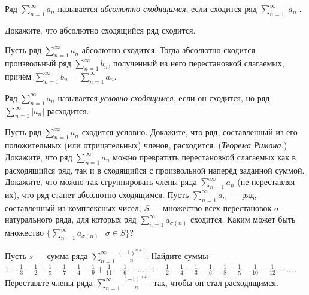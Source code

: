 \documentclass[a4paper,11pt]{article}
\begin{document}
\vspace*{-1mm}
\vspace*{-2mm}

Ряд $\sum\limits_{n=1}^\infty a_n$ называется
{\em абсолютно сходящимся}, если сходится ряд
$\sum\limits_{n=1}^\infty|a_n|$.

Докажите, что абсолютно сходящийся ряд сходится.

Пусть ряд $\sum\limits_{n=1}^\infty a_n$ абсолютно
сходится. Тогда абсолютно сходится произвольный ряд
$\sum\limits_{n=1}^\infty b_n$, полученный из него
перестановкой слагаемых, причём
$\sum\limits_{n=1}^\infty b_n=\sum\limits_{n=1}^\infty a_n$.

\vspace*{-3mm}
Ряд $\sum\limits_{n=1}^\infty a_n$ называется
{\em условно сходящимся}, если он сходится,
но ряд $\sum\limits_{n=1}^\infty|a_n|$ расходится.

Пусть ряд $\sum\limits_{n=1}^\infty a_n$ сходится условно.
Докажите, что ряд, составленный из его положительных
(или отрицательных) членов, расходится.
({\em Теорема Римана.})
Докажите, что ряд $\sum\limits_{n=1}^\infty a_n$ можно превратить
перестановкой слагаемых как в расходящийся ряд, так и в сходящийся
с произвольной наперёд заданной суммой.
Докажите, что можно так сгруппировать члены ряда
$\sum\limits_{n=1}^\infty a_n$ (не переставляя их),
что ряд станет абсолютно сходящимся.
Пусть $\sum\limits_{n=1}^\infty a_n$~--- ряд, составленный
из комплексных чисел, $S$ --- множество всех перестановок $\sigma$
натурального ряда, для которых ряд $\sum\limits_{n=1}^\infty a_{\sigma(n)}$
сходится. Каким может быть множество
$\{\sum\limits_{n=1}^\infty a_{\sigma(n)}\ |\ \sigma\in S\}$?



Пусть $s$ --- сумма ряда
$\sum\limits_{n=1}^\infty \frac{(-1)^{n+1}}{n}$. %
Найдите суммы\\
$1+\frac13-\frac12+\frac15+\frac17-\frac14+\frac19+\frac1{11}-\frac16+\ldots$\,;
$1-\frac12-\frac14+\frac13-\frac16-\frac18+\frac15-\frac1{10}-\frac1{12}+\ldots$\,.\\
Переставьте члены ряда $\sum\limits_{n=1}^\infty \frac{(-1)^{n+1}}{n}$
так, чтобы он стал расходящимся.
\end{document}
